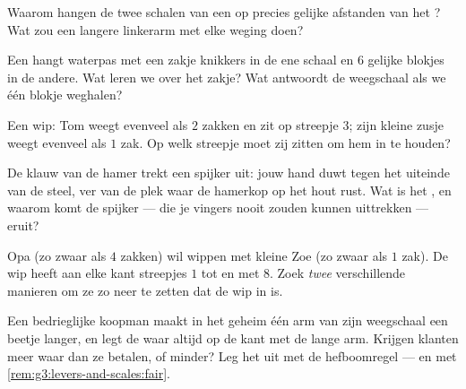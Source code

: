 \begin{exercise}[$\star$]\label{exo:g3:levers-and-scales:6}
Waarom hangen de twee schalen van een  op precies
gelijke afstanden van het ? Wat zou een langere linkerarm met
elke weging doen?
\end{exercise}

\begin{exercise}[$\star$]\label{exo:g3:levers-and-scales:7}
Een  hangt waterpas met een zakje knikkers in de ene
schaal en $6$ gelijke blokjes in de andere. Wat leren we over het
zakje? Wat antwoordt de weegschaal als we één blokje weghalen?
\end{exercise}

\begin{exercise}[$\star$]\label{exo:g3:levers-and-scales:8}
Een wip: Tom weegt evenveel als $2$ zakken en zit op streepje $3$;
zijn kleine zusje weegt evenveel als $1$ zak. Op welk streepje moet
zij zitten om hem in  te houden?
\end{exercise}

\begin{exercise}[$\star$]\label{exo:g3:levers-and-scales:9}
De klauw van de hamer trekt een spijker uit: jouw hand duwt tegen het
uiteinde van de steel, ver van de plek waar de hamerkop op het hout
rust. Wat is het , en waarom komt de spijker --- die je
vingers nooit zouden kunnen uittrekken --- eruit?
\end{exercise}

\begin{exercise}[$\star\star$]\label{exo:g3:levers-and-scales:10}
Opa (zo zwaar als $4$ zakken) wil wippen met kleine Zoe (zo zwaar als
$1$ zak). De wip heeft aan elke kant streepjes $1$ tot en met $8$.
Zoek \emph{twee} verschillende manieren om ze zo neer te zetten dat de
wip in  is.
\end{exercise}

\begin{exercise}[$\star\star$]\label{exo:g3:levers-and-scales:11}
Een bedrieglijke koopman maakt in het geheim één arm van zijn
weegschaal een beetje langer, en legt de waar altijd op de kant met de
lange arm. Krijgen klanten meer waar dan ze betalen, of minder? Leg
het uit met de hefboomregel --- en met
\cref{rem:g3:levers-and-scales:fair}.
\end{exercise}
